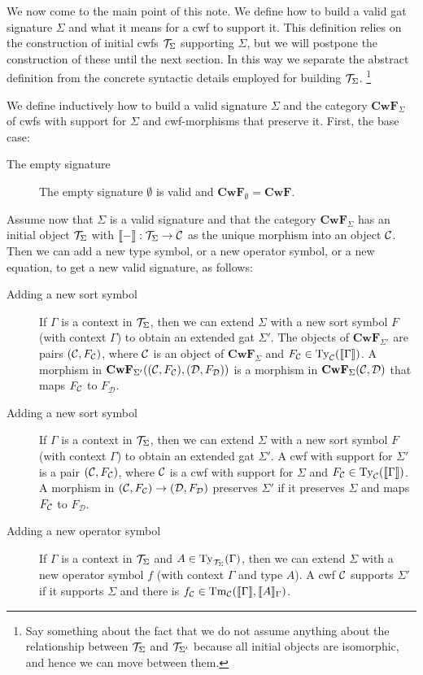 \documentclass{lmcs}
\def\D{\mathcal{D}}
\def\Cwf{\mathbf{CwF}}
\begin{document}
We now come to the main point of this note. We define how to build a valid gat signature $\Sigma$ and what it means for a cwf to support it. This definition relies on the construction of initial cwfs ${\mathcal T}_\Sigma$ supporting $\Sigma$, but we will postpone the construction of these until the next section. In this way we separate the abstract definition from the concrete syntactic details employed for building ${\mathcal T}_\Sigma$. 
\footnote{Say something about the fact that we do not assume anything about the relationship between ${\mathcal T}_\Sigma$ and ${\mathcal T}_{\Sigma'}$ because all initial objects are isomorphic, and hence we can move between them.}
\begin{definition}
We define inductively how to build a valid signature $\Sigma$ and the category $\Cwf_\Sigma$ of cwfs with support for $\Sigma$ and cwf-morphisms that preserve it. First, the base case:
\begin{description}
\item[The empty signature] The empty signature $\emptyset$ is valid and $\Cwf_\emptyset = \Cwf$. 
\end{description}
Assume now that $\Sigma$ is a valid signature and that the category $\Cwf_\Sigma$ has an initial object ${\mathcal T}_\Sigma$ with $\llbracket - \rrbracket : {\mathcal T}_\Sigma \to {\mathcal C}$ as the unique morphism into an object ${\mathcal C}$. Then we can add a new type symbol, or a new operator symbol, or a new equation, to get a new valid signature, as follows:
\begin{description}
\item[Adding a new sort symbol] 
If $\Gamma$ is a context in ${\mathcal T}_\Sigma$, then we can extend $\Sigma$ with a new sort symbol $F$ (with context $\Gamma$) to obtain an extended gat $\Sigma'$. The objects of $\Cwf_{\Sigma'}$ are pairs $({\mathcal C},F_{\mathcal C})$, where ${\mathcal C}$ is an object of $\Cwf_{\Sigma}$ and $F_{\mathcal C} \in \mathrm{Ty}_{\mathcal C}(\llbracket \Gamma \rrbracket)$. A morphism in $\Cwf_{\Sigma'}((\C,F_\C), (\D,F_\D))$ is a morphism in $\Cwf_{\Sigma}(\C,\D)$ that maps $F_{\mathcal C}$ to $F_\D$.
\item[Adding a new sort symbol] 
If $\Gamma$ is a context in ${\mathcal T}_\Sigma$, then we can extend $\Sigma$ with a new sort symbol $F$ (with context $\Gamma$) to obtain an extended gat $\Sigma'$. A cwf with support for $\Sigma'$ is a pair $({\mathcal C},F_{\mathcal C})$, where ${\mathcal C}$ is a cwf with support for $\Sigma$  and $F_{\mathcal C} \in \mathrm{Ty}_{\mathcal C}(\llbracket \Gamma \rrbracket)$. A morphism in $(\C,F_\C) \to (\D,F_\D)$ preserves $\Sigma'$ if it preserves $\Sigma$ and maps $F_{\mathcal C}$ to $F_\D$.
\item[Adding a new operator symbol] 
If $\Gamma$ is a context in ${\mathcal T}_\Sigma$ and $A \in \mathrm{Ty}_{{\mathcal T}_\Sigma}(\Gamma)$, then we can extend $\Sigma$ with a new operator symbol $f$ (with context $\Gamma$ and type $A$). A cwf ${\mathcal C}$ supports $\Sigma'$ if it supports $\Sigma$ and there is $f_{\mathcal C} \in\mathrm{Tm}_{\mathcal C}(\llbracket \Gamma \rrbracket,\llbracket A \rrbracket_{\Gamma})$.

\end{description}
\end{definition}
\end{document}
